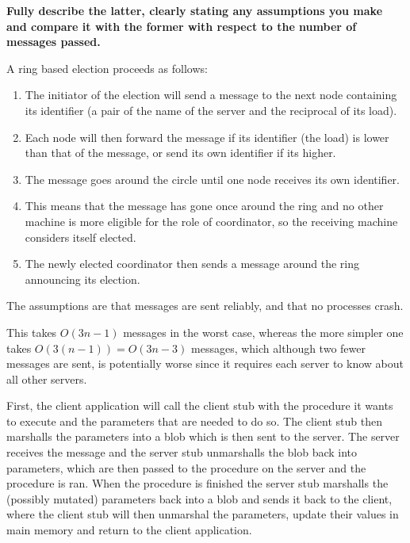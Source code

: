 
\textbf{Fully describe the latter, clearly stating any assumptions you make and
compare it with the former with respect to the number of messages passed.}

A ring based election proceeds as follows:

\begin{enumerate}
  \item The initiator of the election will send a message to the next node
    containing its identifier (a pair of the name of the server and the
    reciprocal of its load).
  \item Each node will then forward the message if its identifier (the load) is
    lower than that of the message, or send its own identifier if its higher.
  \item The message goes around the circle until one node receives its own
    identifier.
  \item This means that the message has gone once around the ring and no other
    machine is more eligible for the role of coordinator, so the receiving
    machine considers itself elected.
  \item The newly elected coordinator then sends a message around the ring 
    announcing its election.
\end{enumerate}

The assumptions are that messages are sent reliably, and that no processes
crash.

This takes $O(3n-1)$ messages in the worst case, whereas the more simpler one
takes $O(3(n-1)) = O(3n - 3)$ messages, which although two fewer messages are
sent, is potentially worse since it requires each server to know about all other
servers.


First, the client application will call the client stub with the procedure it
wants to execute and the parameters that are needed to do so. The client stub
then marshalls the parameters into a blob which is then sent to the server. The
server receives the message and the server stub unmarshalls the blob back into
parameters, which are then passed to the procedure on the server and the
procedure is ran. When the procedure is finished the server stub marshalls the
(possibly mutated) parameters back into a blob and sends it back to the client,
where the client stub will then unmarshal the parameters, update their values
in main memory and return to the client application.

